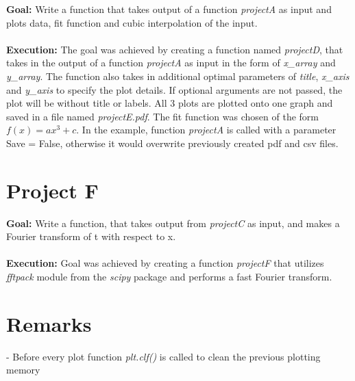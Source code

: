\documentclass[a4paper,12pt]{article}
\begin{document}
\textbf{Goal:} Write a function that takes output of a function \textit{projectA} as input and plots data, fit function and cubic interpolation of the input. \\ \\ \textbf{Execution:} The goal was achieved by creating a function named \textit{projectD}, that takes in the output of a function \textit{projectA} as input in the form of \textit{x\_array} and \textit{y\_array}. The function also takes in additional optimal parameters of \textit{title}, \textit{x\_axis} and \textit{y\_axis} to specify the plot details. If optional arguments are not passed, the plot will be without title or labels. All 3 plots are plotted onto one graph and saved in a file named \textit{projectE.pdf}. The fit function was chosen of the form $f(x)=ax^{3}+c$. In the example, function \textit{projectA} is called with a parameter Save = False, otherwise it would overwrite previously created pdf and csv files. 

\section{Project F}

\textbf{Goal:} Write a function, that takes output from \textit{projectC} as input, and makes a Fourier transform of t with respect to x. \\ \\ \textbf{Execution:} Goal was achieved by creating a function \textit{projectF} that utilizes \textit{fftpack} module from the \textit{scipy} package and performs a fast Fourier transform.

\section{Remarks}

- Before every plot function \textit{plt.clf()} is called to clean the previous plotting memory 
\end{document}
